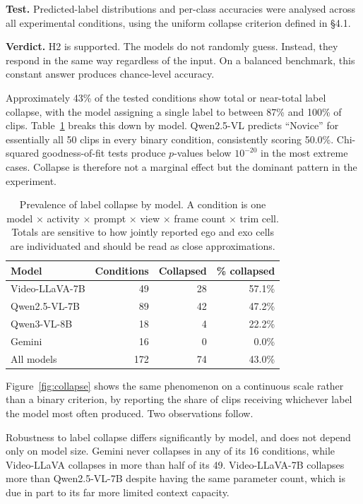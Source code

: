\documentclass[logo,msc]{infthesis}
\newcommand{\runin}[1]{\par\medskip\noindent\textbf{#1}}
\begin{document}
\runin{Test.} Predicted-label distributions and per-class accuracies
were analysed across all experimental conditions, using the uniform
collapse criterion defined in §4.1.

\runin{Verdict.} H2 is supported. The models do not randomly guess.
Instead, they respond in the same way regardless of the input. On a
balanced benchmark, this constant answer produces chance-level accuracy.

Approximately 43\% of the tested conditions show total or near-total label
collapse, with the model assigning a single label to between 87\% and 100\%
of clips. Table~\ref{tab:collapse-prevalence} breaks this down by model.
Qwen2.5-VL predicts ``Novice'' for essentially all 50 clips in every binary
condition, consistently scoring 50.0\%. Chi-squared goodness-of-fit tests
produce $p$-values below $10^{-20}$ in the most extreme cases. Collapse is
therefore not a marginal effect but the dominant pattern in the experiment.

\begin{table}[H]
\centering
\caption{Prevalence of label collapse by model. A condition is one
model $\times$ activity $\times$ prompt $\times$ view $\times$ frame count
$\times$ trim cell. Totals are sensitive to how jointly reported ego and
exo cells are individuated and should be read as close approximations.}
\label{tab:collapse-prevalence}
\small
\begin{tabular}{@{}l r r r@{}}
\toprule
\textbf{Model} & \textbf{Conditions} & \textbf{Collapsed}
 & \textbf{\% collapsed} \\
\midrule
Video-LLaVA-7B & 49  & 28 & 57.1\% \\
Qwen2.5-VL-7B  & 89  & 42 & 47.2\% \\
Qwen3-VL-8B    & 18  &  4 & 22.2\% \\
Gemini         & 16  &  0 &  0.0\% \\
\midrule
All models     & 172 & 74 & 43.0\% \\
\bottomrule
\end{tabular}
\end{table}

Figure~\ref{fig:collapse} shows the same phenomenon on a continuous scale
rather than a binary criterion, by reporting the share of clips receiving
whichever label the model most often produced. Two observations follow.

Robustness to label collapse differs significantly by model, and does not
depend only on model size. Gemini never collapses in any of its 16
conditions, while Video-LLaVA collapses in more than half of its 49.
Video-LLaVA-7B collapses more than Qwen2.5-VL-7B despite having the same
parameter count, which is due in part to its far more limited context
capacity.
\end{document}
